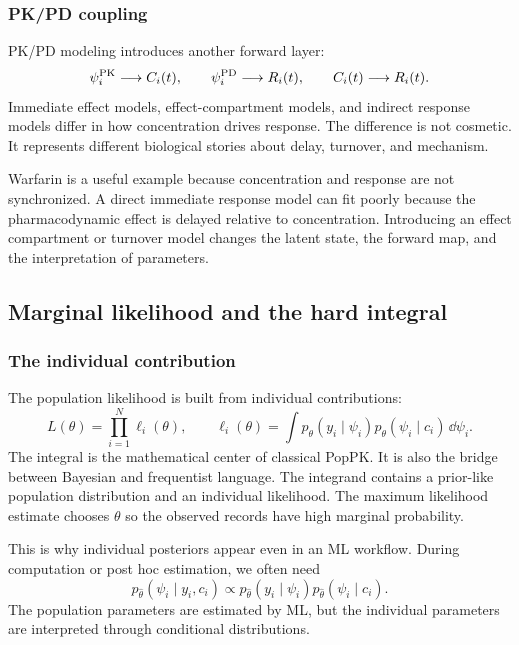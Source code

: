 \subsubsection*{PK/PD coupling}

PK/PD modeling introduces another forward layer:
\[
  \psi_i^{\mathrm{PK}}\longrightarrow C_i(t),
  \qquad
  \psi_i^{\mathrm{PD}}\longrightarrow R_i(t),
  \qquad
  C_i(t)\longrightarrow R_i(t).
\]
Immediate effect models, effect-compartment models, and indirect response models differ in how concentration drives response.  The difference is not cosmetic.  It represents different biological stories about delay, turnover, and mechanism.

Warfarin is a useful example because concentration and response are not synchronized.  A direct immediate response model can fit poorly because the pharmacodynamic effect is delayed relative to concentration.  Introducing an effect compartment or turnover model changes the latent state, the forward map, and the interpretation of parameters.

\subsection{Marginal likelihood and the hard integral}

\subsubsection*{The individual contribution}

The population likelihood is built from individual contributions:
\[
  L(\theta)
  =
  \prod_{i=1}^{N}
  \ell_i(\theta),
  \qquad
  \ell_i(\theta)
  =
  \int
  p_\theta(y_i\mid\psi_i)
  p_\theta(\psi_i\mid c_i)
  \,\dd\psi_i.
\]
The integral is the mathematical center of classical PopPK.  It is also the bridge between Bayesian and frequentist language.  The integrand contains a prior-like population distribution and an individual likelihood.  The maximum likelihood estimate chooses \(\theta\) so the observed records have high marginal probability.

This is why individual posteriors appear even in an ML workflow.  During computation or post hoc estimation, we often need
\[
  p_{\widehat\theta}(\psi_i\mid y_i,c_i)
  \propto
  p_{\widehat\theta}(y_i\mid \psi_i)
  p_{\widehat\theta}(\psi_i\mid c_i).
\]
The population parameters are estimated by ML, but the individual parameters are interpreted through conditional distributions.

